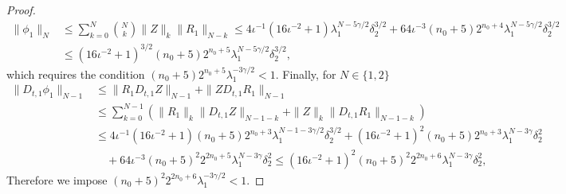 \documentclass[10pt,a4paper]{amsart}
\numberwithin{equation}{section}
\numberwithin{corollario}{section}
\numberwithin{lemma}{section}
\numberwithin{prop}{section}
\theoremstyle{definition}
\theoremstyle{remark}
\begin{document}
\begin{proof}
\begin{align}
    \| \phi_1 \|_N
    &\leq
    \sum_{k=0}^{N} \binom{N}{k} \|Z\|_k \|R_1\|_{N-k} 
    \leq 
    4\iota^{-1}(16\iota^{-2}+1) \lambda_1^{N-5\gamma/2} \delta_2^{3/2} +64\iota^{-3} (n_0+5) 2^{n_0+4} \lambda_1^{N-5\gamma/2} \delta_2^{3/2}
    \\
    &\leq
    (16\iota^{-2}+1)^{3/2}(n_0+5) 2^{n_0+5}\lambda_1^{N-5\gamma/2} \delta_2^{3/2},
\end{align}
which requires the condition $(n_0+5) 2^{n_0+5} \lambda_1^{-3\gamma/2} < 1$.
Finally, for $N \in \{1,2\}$
\begin{align}
  \| D_{t,1}\phi_1 \|_{N-1} 
  &\leq \|R_1 D_{t,1}Z  \|_{N-1}+\|Z D_{t,1}R_1 \|_{N-1}
\\&
\leq \sum_{k=0}^{N-1} (\|R_1\|_k \|D_{t,1}Z  \|_{N-1-k} + \|Z\|_k \|D_{t,1}R_1  \|_{N-1-k})
\\
&\leq
4\iota^{-1}(16\iota^{-2}+1)(n_0+5)2^{n_0+3} \lambda_1^{N-1-3\gamma/2}\delta_2^{3/2}
+
(16\iota^{-2}+1)^2(n_0+5)2^{n_0+3} \lambda_1^{N-3\gamma}\delta_2^{2}
\\
&\quad+
64\iota^{-3}(n_0+5)^2 2^{2n_0+5} \lambda_1^{N-3\gamma} \delta_2^2
\leq
(16\iota^{-2}+1)^2(n_0+5)^2 2^{2n_0+6}\lambda_1^{N-3\gamma} \delta_2^2,
\end{align}
Therefore we impose $(n_0+5)^2 2^{2n_0+6} \lambda_1^{-3\gamma/2} < 1$.
\end{proof}
\end{document}
